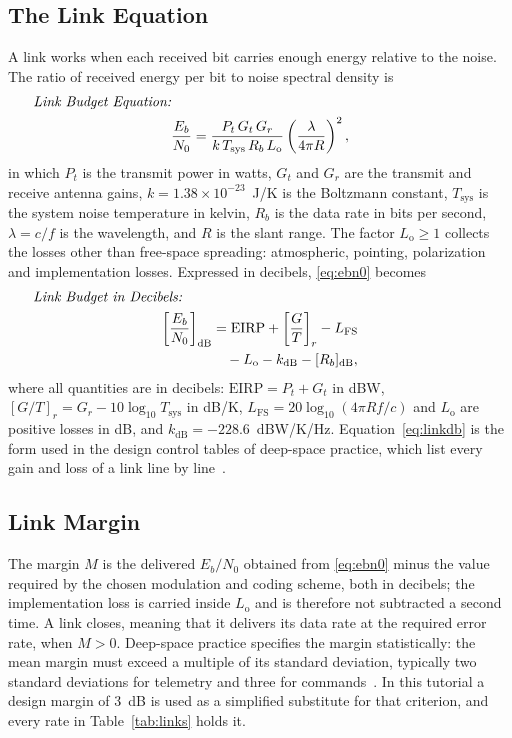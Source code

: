 \documentclass{IEEEoj}
\newcommand{\eqname}[1]{\makebox[\linewidth][l]{\hspace{1em}\textit{#1:}}\notag}
\begin{document}
\subsection{The Link Equation}

A link works when each received bit carries enough energy relative to the noise. The ratio of received energy per bit to noise spectral density is
\begin{gather}
\eqname{Link Budget Equation}\\
\frac{E_b}{N_0} = \frac{P_t \, G_t \, G_r}{k \, T_{\mathrm{sys}} \, R_b \, L_{\mathrm{o}}} \left(\frac{\lambda}{4\pi R}\right)^{2},
\label{eq:ebn0}
\end{gather}
in which $P_t$ is the transmit power in watts, $G_t$ and $G_r$ are the transmit and receive antenna gains, $k = 1.38 \times 10^{-23}$~J/K is the Boltzmann constant, $T_{\mathrm{sys}}$ is the system noise temperature in kelvin, $R_b$ is the data rate in bits per second, $\lambda = c/f$ is the wavelength, and $R$ is the slant range. The factor $L_{\mathrm{o}} \geq 1$ collects the losses other than free-space spreading: atmospheric, pointing, polarization and implementation losses. Expressed in decibels, \eqref{eq:ebn0} becomes
\begin{gather}
\eqname{Link Budget in Decibels}\\
\begin{split}
\left[\frac{E_b}{N_0}\right]_{\mathrm{dB}} &= \mathrm{EIRP} + \left[\frac{G}{T}\right]_{r} - L_{\mathrm{FS}} \\
&\quad - L_{\mathrm{o}} - k_{\mathrm{dB}} - [R_b]_{\mathrm{dB}},
\end{split}
\label{eq:linkdb}
\end{gather}
where all quantities are in decibels: $\mathrm{EIRP} = P_t + G_t$ in dBW, $[G/T]_r = G_r - 10\log_{10} T_{\mathrm{sys}}$ in dB/K, $L_{\mathrm{FS}} = 20\log_{10}(4\pi R f / c)$ and $L_{\mathrm{o}}$ are positive losses in dB, and $k_{\mathrm{dB}} = -228.6$~dBW/K/Hz. Equation~\eqref{eq:linkdb} is the form used in the design control tables of deep-space practice, which list every gain and loss of a link line by line~\cite{yuen_descanso,dsn_810_005}.



\subsection{Link Margin}
\label{sec:margin}

The margin $M$ is the delivered $E_b/N_0$ obtained from \eqref{eq:ebn0} minus the value required by the chosen modulation and coding scheme, both in decibels; the implementation loss is carried inside $L_{\mathrm{o}}$ and is therefore not subtracted a second time. A link closes, meaning that it delivers its data rate at the required error rate, when $M > 0$. Deep-space practice specifies the margin statistically: the mean margin must exceed a multiple of its standard deviation, typically two standard deviations for telemetry and three for commands~\cite{yuen_descanso}. In this tutorial a design margin of \SI{3}{dB} is used as a simplified substitute for that criterion, and every rate in Table~\ref{tab:links} holds it.
\end{document}
